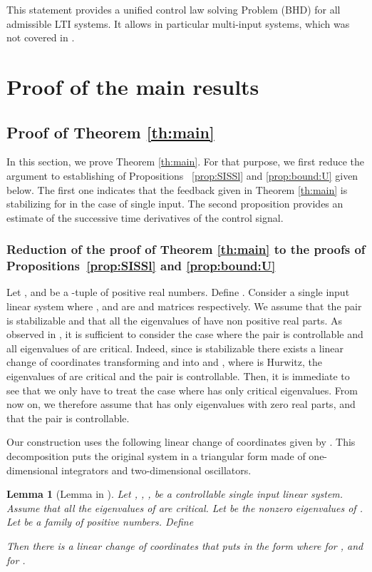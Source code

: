 \documentclass[letterpaper, 10pt]{article}
\newtheorem{lem}{Lemma}
\begin{document}
This statement provides a unified control law solving Problem (BHD) for all admissible LTI systems. It allows in particular multi-input systems, which was not covered in \cite{LCC1}.

\section{Proof of the main results}\label{sec:proofs}

\subsection{Proof of Theorem \ref{th:main}}
In this section, we prove Theorem \ref{th:main}. For that purpose, we first reduce the argument to establishing of Propositions ~\ref{prop:SISSl} and \ref{prop:bound:U} given below. The first one indicates that the feedback given in Theorem \ref{th:main} is  stabilizing for  in the case of single input. The second proposition provides an estimate of the successive time derivatives of the control signal.
\subsubsection{Reduction of the proof of Theorem \ref{th:main} to the proofs of Propositions~\ref{prop:SISSl} and \ref{prop:bound:U}}\label{sec:red:th1}

Let ,  and  be a -tuple of positive real numbers. Define . Consider a single input linear system  where ,  and  are  and  matrices respectively. We assume that the pair  is stabilizable and that all the eigenvalues of  have non positive real parts. As observed in \cite{SSY}, it is sufficient to consider the case where the pair  is controllable and all eigenvalues of  are critical. Indeed, since  is stabilizable there exists a linear change of coordinates transforming  and  into  and ,  where  is Hurwitz, the eigenvalues of  are critical and the pair  is controllable. Then, it is immediate to see that we only have to treat the case where  has only critical eigenvalues. From now on, we therefore assume that  has only eigenvalues with zero real parts, and that the pair  is controllable.

Our construction uses the following linear change of coordinates given by \cite[Lemma 5.2]{SSY}. This decomposition puts the original system in a triangular form made of one-dimensional integrators and two-dimensional oscillators.
\begin{lem}[Lemma  in \cite{SSY}]
\label{lem:SSY}
Let , , , be a controllable single input linear system. Assume that all the eigenvalues of  are critical. Let  be the nonzero eigenvalues of . Let  be a family of positive numbers. Define 

Then there is a linear change of coordinates that puts  in the form
 where  for  , and  for .
\end{lem}
\end{document}
